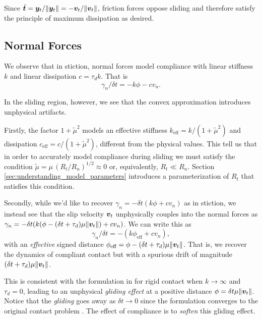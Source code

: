 Since $\hat{{\bm{t}}} = {\bm{y}}_t/\Vert{\bm{y}}_t\Vert =
-{\bm{v}}_t/\Vert{\bm{v}}_t\Vert$, friction forces oppose sliding and therefore
satisfy the principle of maximum dissipation as desired.

\subsection{Normal Forces}
We observe that in stiction, normal forces model compliance with linear
stiffness $k$ and linear dissipation $c = \tau_d k$. That is
\begin{equation*}
    \gamma_n/ \delta t = -k\phi - c v_n.
\end{equation*}

In the sliding region, however, we see that the convex approximation introduces
unphysical artifacts. 

Firstly, the factor $1+\tilde{\mu}^2$ models an effective stiffness
$k_\text{eff}=k/(1+\tilde{\mu}^2)$ and dissipation
$c_\text{eff}=c/(1+\tilde{\mu}^2)$, different from the physical values. This
tell us that in order to accurately model compliance during sliding we must
satisfy the condition $\tilde\mu=\mu\,(R_t/R_n)^{1/2} \approx 0$ or,
equivalently, $R_t \ll R_n$. Section \ref{sec:understanding_model_parameters}
introduces a parameterization of $R_t$ that satisfies this condition.

Secondly, while we'd like to recover $\gamma_n = -\delta t(k\phi + c v_n)$ as in
stiction, we instead see that the slip velocity ${\bm{v}}_t$
unphysically couples into the normal forces as $\gamma_n=-\delta
t(k(\phi-(\delta t+\tau_d)\mu\Vert{\bm{v}}_t\Vert) + cv_n)$. We can write this as
\begin{equation*}
  \gamma_n/\delta t=-(k\phi_\text{eff} + c v_n),
\end{equation*}
with an \textit{effective} signed distance $\phi_\text{eff} = \phi-(\delta
t+\tau_d)\mu\Vert{\bm{v}}_t\Vert$. That is, we recover the dynamics of compliant
contact but with a spurious drift of magnitude 
$(\delta t+\tau_d)\mu\Vert{\bm{v}}_t\Vert$.

This is consistent with the formulation in \cite{bib:anitescu2010} for rigid
contact when $k\rightarrow \infty$ and $\tau_d=0$, leading to an unphysical
\textit{gliding effect} at a positive distance $\phi=\delta
t\mu\Vert{\bm{v}}_t\Vert$. Notice that the \textit{gliding} goes away as $\delta
t\rightarrow 0$ since the formulation converges to the original contact problem
\cite{bib:anitescu2006}. The effect of compliance is to \textit{soften} this
gliding effect. 

